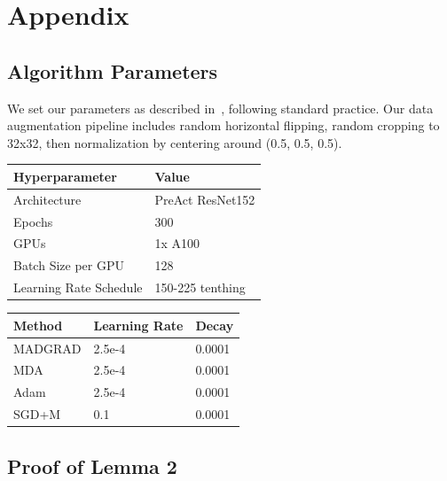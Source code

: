 \documentclass{article}
\begin{document}
\newpage




\newpage

\appendix
\section{Appendix}
\subsection{Algorithm Parameters}\label{algoparams}

We set our parameters as described in~\cite{defazio_adaptivity_nodate}, following standard practice. Our data
augmentation pipeline includes random horizontal flipping, random cropping to 32x32, then normalization by centering
around (0.5, 0.5, 0.5).

\begin{center}
  \begin{tabular}{ | l | l | }
  \hline
  \textbf{Hyperparameter} & \textbf{Value} \\
  \hline
  Architecture & PreAct ResNet152 \\
  \hline
  Epochs & 300 \\
  \hline
  GPUs & 1x A100 \\
  \hline
  Batch Size per GPU & 128 \\
  \hline
  Learning Rate Schedule & 150-225 tenthing \\
  \hline
\end{tabular}
\end{center}

\begin{center}
  \begin{tabular}{ | l | l | l |}
    \hline
    Method & Learning Rate & Decay \\
    \hline
    MADGRAD & 2.5e-4 & 0.0001 \\
    \hline
    MDA & 2.5e-4 & 0.0001 \\
    \hline
    Adam & 2.5e-4 & 0.0001 \\
    \hline
    SGD+M & 0.1 & 0.0001 \\
    \hline
  \end{tabular}
\end{center}

\subsection{Proof of Lemma 2}\label{lemmaproof:2}
\end{document}
